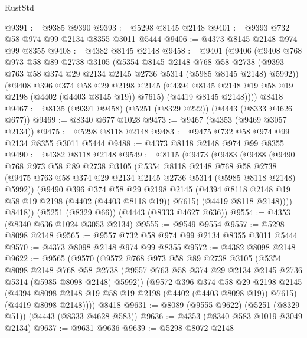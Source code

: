 \begin{lexlean}{RustStd}
\begin{coremodule}
@9391 := @9385 @9390
@9393 := @5298 @8145 @2148
@9401 := @9393 @732 @58 @974 @99 @2134 @8355 @3011 @5444
@9406 := @4373 @8145 @2148 @974 @99 @8355
@9408 := @4382 @8145 @2148
@9458 := @9401
    (@9406
      (@9408
        @768
        @973
        @58
        @89
        @2738
        @3105
        (@5354
          @8145
          @2148
          @768
          @58
          @2738
          (@9393 @763 @58 @374 @29 @2134 @2145 @2736 @5314 (@5985 @8145 @2148) @5992))
        (@9408
          @396
          @374
          @58
          @29
          @2198
          @2145
          (@4394 @8145 @2148 @19 @58 @19 @2198 (@4402 (@4403 @8145 @19)) @7615)
          (@4419 @8145 @2148))))
    @8418
@9467 := @8135 (@9391 @9458) (@5251 (@8329 @222)) (@4443 (@8333 @4626 @677))
@9469 := @8340 @677 @1028
@9473 := @9467 (@4353 (@9469 @3057 @2134))
@9475 := @5298 @8118 @2148
@9483 := @9475 @732 @58 @974 @99 @2134 @8355 @3011 @5444
@9488 := @4373 @8118 @2148 @974 @99 @8355
@9490 := @4382 @8118 @2148
@9549 := @8115
    (@9473
      (@9483
        (@9488
          (@9490
            @768
            @973
            @58
            @89
            @2738
            @3105
            (@5354
              @8118
              @2148
              @768
              @58
              @2738
              (@9475 @763 @58 @374 @29 @2134 @2145 @2736 @5314 (@5985 @8118 @2148) @5992))
            (@9490
              @396
              @374
              @58
              @29
              @2198
              @2145
              (@4394 @8118 @2148 @19 @58 @19 @2198 (@4402 (@4403 @8118 @19)) @7615)
              (@4419 @8118 @2148))))
        @8418))
    (@5251 (@8329 @66))
    (@4443 (@8333 @4627 @636))
@9554 := @4353 (@8340 @636 @1024 @3053 @2134)
@9555 := @9549 @9554
@9557 := @5298 @8098 @2148
@9565 := @9557 @732 @58 @974 @99 @2134 @8355 @3011 @5444
@9570 := @4373 @8098 @2148 @974 @99 @8355
@9572 := @4382 @8098 @2148
@9622 := @9565
    (@9570
      (@9572
        @768
        @973
        @58
        @89
        @2738
        @3105
        (@5354
          @8098
          @2148
          @768
          @58
          @2738
          (@9557 @763 @58 @374 @29 @2134 @2145 @2736 @5314 (@5985 @8098 @2148) @5992))
        (@9572
          @396
          @374
          @58
          @29
          @2198
          @2145
          (@4394 @8098 @2148 @19 @58 @19 @2198 (@4402 (@4403 @8098 @19)) @7615)
          (@4419 @8098 @2148))))
    @8418
@9631 := @8089 (@9555 @9622) (@5251 (@8329 @51)) (@4443 (@8333 @4628 @583))
@9636 := @4353 (@8340 @583 @1019 @3049 @2134)
@9637 := @9631 @9636
@9639 := @5298 @8072 @2148

\end{coremodule}
\end{lexlean}

